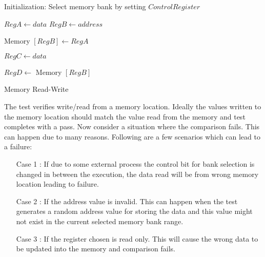 \IncMargin{1em}
\begin{algorithm}[H]
\DontPrintSemicolon
{}

\BlankLine
Initialization: Select memory bank by setting $Control Register$ \;

	$Reg A \longleftarrow data$\;
	$Reg B \longleftarrow address$\;

	Memory $[Reg B] \longleftarrow Reg A $\;

	$Reg C \longleftarrow data$\;

	$Reg D \longleftarrow$	Memory $[Reg B]$\; 


\caption{Memory Read-Write}
\end{algorithm}\DecMargin{1em}

\vspace{2cm}
The test verifies write/read from a memory location. Ideally the values written to the memory location should match the value read from the memory and test completes with a pass. Now consider a situation where the comparison fails. This can happen due to many reasons. Following are a few scenarios which can lead to a failure:
\begin{itemize}
\item [Case 1]: If due to some external process the control bit for bank selection is changed in between the execution, the data read will be from wrong memory location leading to failure.

\item [Case 2]: If the address value is invalid. This can happen when the test generates a random address value for storing the data and this value might not exist in the current selected memory bank range.

\item [Case 3]:  If the register chosen is read only. This will cause the wrong data to be updated into the memory and comparison fails.
\end{itemize}

